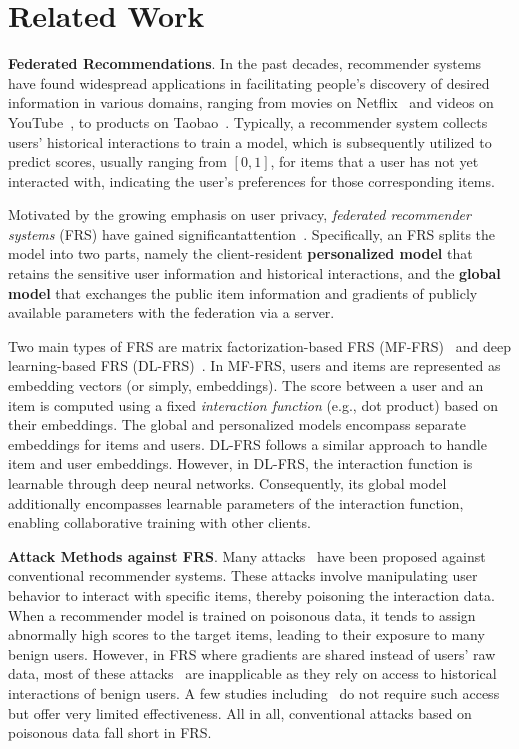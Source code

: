 \section{Related Work} \label{sec:related}

\noindent\textbf{Federated Recommendations}.
In the past decades, recommender systems~\cite{NCF,NGCF,LightGCN,VBPR,CKE,MMGCN} have found widespread applications in facilitating people's discovery of desired information in various domains, ranging from movies on Netflix~\cite{netflix} and videos on YouTube~\cite{youtube}, to products on Taobao~\cite{taobao}.
%
Typically, a recommender system collects users' historical interactions to train a model, which is subsequently utilized to predict scores, usually ranging from $[0,1]$, for items that a user has not yet interacted with, indicating the user's preferences for those corresponding items.

Motivated by the growing emphasis on user privacy, \emph{federated recommender systems} (FRS) have gained significantattention~\cite{FedGNN,FedRec,FedRec++,ammad2019federated,FedFast,Wu0HNWCYZ21,MintoHLH21}.
Specifically, an FRS splits the model into two parts, namely the client-resident \textbf{personalized model} that retains the sensitive user information and historical interactions, and the \textbf{global model} that exchanges the public item information and gradients of publicly available parameters with the federation via a server.

Two main types of FRS are matrix factorization-based FRS (MF-FRS)~\cite{ammad2019federated,FedRec,FedRec++,9162459} and deep learning-based FRS (DL-FRS)~\cite{WangYCYZZ22,perifanis2022federated,jiang2022fedncf}.
%
In MF-FRS, users and items are represented as embedding vectors (or simply, embeddings).
The score between a user and an item is computed using a fixed \emph{interaction function} (e.g., dot product) based on their embeddings. 
The global and personalized models encompass separate embeddings for items and users.
%
DL-FRS follows a similar approach to handle item and user embeddings.
However, in DL-FRS, the interaction function is learnable through deep neural networks. 
Consequently, its global model additionally encompasses learnable parameters of the interaction function, enabling collaborative training with other clients.

\smallskip
\noindent\textbf{Attack Methods against FRS}. 
Many attacks~\cite{Li16Data,HuangMGL0X21,Fang18Po,Fang20In,kapoor2017review} have been proposed against conventional recommender systems.
These attacks involve manipulating user behavior to interact with specific items, thereby poisoning the interaction data.
When a recommender model is trained on poisonous data, it tends to assign abnormally high scores to the target items, leading to their exposure to many benign users.
%
However, in FRS where gradients are shared instead of users' raw data, most of these attacks~\cite{Li16Data,HuangMGL0X21,Fang18Po,Fang20In} are inapplicable as they rely on access to historical interactions of benign users.
A few studies including~\cite{kapoor2017review} do not require such access but offer very limited effectiveness.
All in all, conventional attacks based on poisonous data fall short in FRS.

